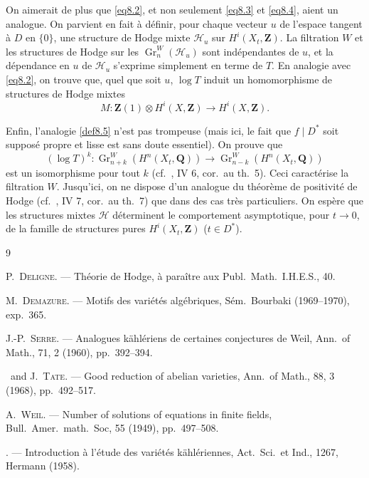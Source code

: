 \documentclass[12pt]{amsart}
\theoremstyle{definition}
\DeclareMathOperator{\Gr}{Gr}
\newcommand{\Q}{\mathbf{Q}}
\newcommand{\Z}{\mathbf{Z}}
\begin{document}
On aimerait de plus que \eqref{eq8.2}, et non seulement \eqref{eq8.3} et \eqref{eq8.4}, aient un analogue. On parvient en fait à définir, pour chaque vecteur $u$ de l'espace tangent à $D$ en $\{0\}$, une structure de Hodge mixte $\mathscr{H}_{u}$ sur $H^{i}(X_{t}, \Z)$. La filtration $W$ et les structures de Hodge sur les $\Gr_{n}^{W}(\mathscr{H}_{u})$ sont indépendantes de $u$, et la dépendance en $u$ de $\mathscr{H}_{u}$ s'exprime simplement en terme de $T$. En analogie avec \eqref{eq8.2}, on trouve que, quel que soit $u$, $\log T$ induit un homomorphisme de structures de Hodge mixtes
\[
M : \Z(1) \otimes H^{i}(X, \Z) \to H^{i}(X, \Z).
\]

Enfin, l'analogie \ref{def8.5} n'est pas trompeuse (mais ici, le fait que $f \mid D^{*}$ soit supposé propre et lisse est sans doute essentiel). On prouve que
\[
(\log T)^{k} : \Gr_{n+k}^{W}(H^{n}(X_{t}, \Q)) \to \Gr_{n-k}^{W}(H^{n}(X_{t}, \Q))
\]
est un isomorphisme pour tout $k$ (cf.\ \cite{Weyl}, IV 6, cor.\ au th.\ 5). Ceci caractérise la filtration $W$. Jusqu'ici, on ne dispose d'un analogue du théorème de positivité de Hodge (cf.\ \cite{Weyl}, IV 7, cor.\ au th.\ 7) que dans des cas très particuliers. On espère que les structures mixtes $\mathscr{H}$ déterminent le comportement asymptotique, pour $t \to 0$, de la famille de structures pures $H^{i}(X_{t}, \Z)$ ($t \in D^{*}$).

\begin{thebibliography}{9}

 P.\ \textsc{Deligne}. --- Théorie de Hodge, à paraître aux Publ.\ Math.\ I.H.E.S., 40.

 M.\ \textsc{Demazure}. --- Motifs des variétés algébriques, Sém.\ Bourbaki (1969--1970), exp.\ 365.

 J.-P.\ \textsc{Serre}. --- Analogues kählériens de certaines conjectures de Weil, Ann.\ of Math., 71, 2 (1960), pp.\ 392--394.

 \bysame\ and J.\ \textsc{Tate}. --- Good reduction of abelian varieties, Ann.\ of Math., 88, 3 (1968), pp.\ 492--517.

 A.\ \textsc{Weil}. --- Number of solutions of equations in finite fields, Bull.\ Amer.\ math.\ Soc, 55 (1949), pp.\ 497--508.

 \bysame. --- Introduction à l'étude des variétés kählériennes, Act.\ Sci.\ et Ind., 1267, Hermann (1958).

\end{thebibliography}
\end{document}
